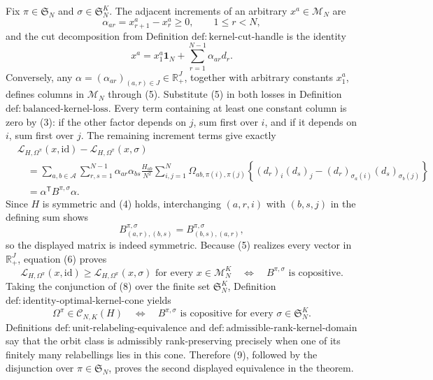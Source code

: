 Fix \(\pi\in\mathfrak S_N\) and \(\sigma\in\mathfrak S_N^K\).  The adjacent increments of an arbitrary \(x^a\in\mathcal M_N\) are
\[
 \alpha_{ar}=x^a_{r+1}-x^a_r\geq0,
 \qquad 1\leq r<N,
\]
and the cut decomposition from Definition \(\mathrm{def{:}kernel\text{-}cut\text{-}handle}\) is the identity
\[
 x^a=x_1^a\mathbf 1_N+\sum_{r=1}^{N-1}\alpha_{ar}d_r. \tag{5}
\]
Conversely, any \(\alpha=(\alpha_{ar})_{(a,r)\in J}\in\mathbb R_+^J\), together with arbitrary constants \(x_1^a\), defines columns in \(\mathcal M_N\) through (5).  Substitute (5) in both losses in Definition \(\mathrm{def{:}balanced\text{-}kernel\text{-}loss}\).  Every term containing at least one constant column is zero by (3): if the other factor depends on \(j\), sum first over \(i\), and if it depends on \(i\), sum first over \(j\).  The remaining increment terms give exactly
\[
\begin{aligned}
 &\mathscr L_{H,\Omega^\pi}(x,\mathrm{id})
 -\mathscr L_{H,\Omega^\pi}(x,\sigma)\\
 &\quad=\sum_{a,b\in\mathcal A}\sum_{r,s=1}^{N-1}
 \alpha_{ar}\alpha_{bs}\frac{H_{ab}}{N^2}
 \sum_{i,j=1}^N\Omega_{ab,\pi(i),\pi(j)}
 \left\{(d_r)_i(d_s)_j-(d_r)_{\sigma_a(i)}(d_s)_{\sigma_b(j)}\right\}\\
 &\quad=\alpha^{\mathsf T}B^{\pi,\sigma}\alpha. \tag{6}
\end{aligned}
\]
Since \(H\) is symmetric and (4) holds, interchanging \((a,r,i)\) with \((b,s,j)\) in the defining sum shows
\[
 B^{\pi,\sigma}_{(a,r),(b,s)}=B^{\pi,\sigma}_{(b,s),(a,r)}, \tag{7}
\]
so the displayed matrix is indeed symmetric.  Because (5) realizes every vector in \(\mathbb R_+^J\), equation (6) proves
\[
 \mathscr L_{H,\Omega^\pi}(x,\mathrm{id})
 \geq\mathscr L_{H,\Omega^\pi}(x,\sigma)
 \text{ for every }x\in\mathcal M_N^K
 \quad\Longleftrightarrow\quad
 B^{\pi,\sigma}\text{ is copositive}. \tag{8}
\]
Taking the conjunction of (8) over the finite set \(\mathfrak S_N^K\), Definition \(\mathrm{def{:}identity\text{-}optimal\text{-}kernel\text{-}cone}\) yields
\[
 \Omega^\pi\in\mathcal C_{N,K}(H)
 \quad\Longleftrightarrow\quad
 B^{\pi,\sigma}\text{ is copositive for every }\sigma\in\mathfrak S_N^K. \tag{9}
\]
Definitions \(\mathrm{def{:}unit\text{-}relabeling\text{-}equivalence}\) and \(\mathrm{def{:}admissible\text{-}rank\text{-}kernel\text{-}domain}\) say that the orbit class is admissibly rank-preserving precisely when one of its finitely many relabellings lies in this cone.  Therefore (9), followed by the disjunction over \(\pi\in\mathfrak S_N\), proves the second displayed equivalence in the theorem.

